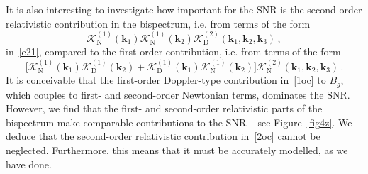 It is also interesting to investigate how important for the SNR is the second-order relativistic contribution in the bispectrum, i.e. from terms of the form
\begin{equation} \label{2oc}
\mathcal{K}^{(1)}_{\mathrm{N}}(\bm{k}_{1})\mathcal{K}^{(1)}_{\mathrm{N}}(\bm{k}_{2})\mathcal{K}^{(2)}_{\mathrm{D}}(\bm{k}_{1},\bm{k}_{2},\bm{k}_{3})\,,
\end{equation}
in~\eqref{e21},  compared to the first-order contribution, i.e. from terms of the form
 \begin{equation} \label{1oc}
 \Big[\mathcal{K}^{(1)}_{\mathrm{N}}(\bm{k}_{1})\mathcal{K}^{(1)}_{\mathrm{D}}(\bm{k}_{2}) + \mathcal{K}^{(1)}_{\mathrm{D}}(\bm{k}_{1})\mathcal{K}^{(1)}_{\mathrm{N}}(\bm{k}_{2})\Big]\mathcal{K}^{(2)}_{\mathrm{N}}(\bm{k}_{1},\bm{k}_{2},\bm{k}_{3}) \,.
 \end{equation}
 It is conceivable that the first-order Doppler-type contribution in~\eqref{1oc} to $B_g$, which couples to first- and second-order Newtonian terms, dominates the SNR. However, we find that the first- and  second-order relativistic parts of the bispectrum make comparable contributions to the SNR -- see Figure~\ref{fig4z}. We deduce that the second-order relativistic contribution in~\eqref{2oc} cannot be neglected. Furthermore, this means that it must be accurately modelled, as we  have done. 
